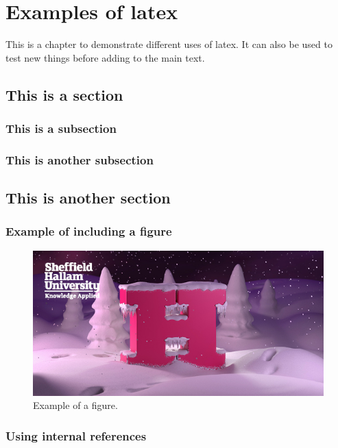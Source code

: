 \chapter{Examples of latex}

This is a chapter to demonstrate different uses of latex.
It can also be used to test new things before adding to the main text.

\section{This is a section}

\subsection{This is a subsection}

\subsection{This is another subsection}

\section{This is another section}

\subsection{Example of including a figure}

\begin{figure}[!htb]
    \centering 
    \includegraphics[scale=0.5]{img.png}
    \caption{Example of a figure.}
    \label{figure:img}
\end{figure}

\subsection{Using internal references}

